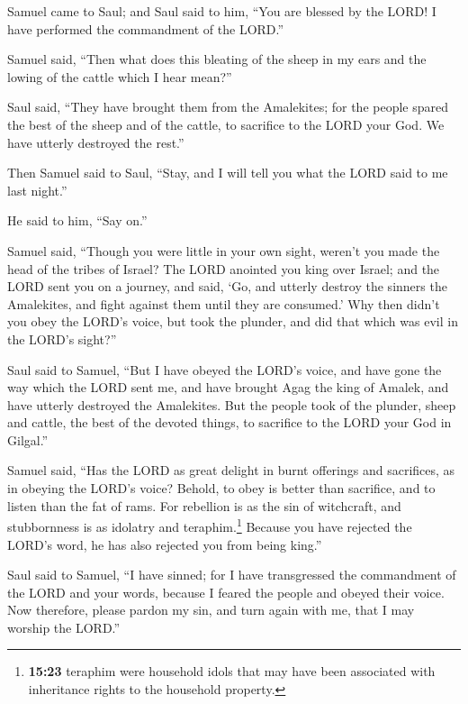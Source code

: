  Samuel came to Saul; and Saul said to him, ``You are
blessed by the LORD! I have performed the commandment of the LORD.''

 Samuel said, ``Then what does this bleating of the sheep
in my ears and the lowing of the cattle which I hear mean?''

 Saul said, ``They have brought them from the Amalekites;
for the people spared the best of the sheep and of the cattle, to
sacrifice to the LORD your God. We have utterly destroyed the rest.''

 Then Samuel said to Saul, ``Stay, and I will tell you
what the LORD said to me last night.''

He said to him, ``Say on.''

 Samuel said, ``Though you were little in your own sight,
weren't you made the head of the tribes of Israel? The LORD anointed you
king over Israel;  and the LORD sent you on a journey,
and said, `Go, and utterly destroy the sinners the Amalekites, and fight
against them until they are consumed.'  Why then didn't
you obey the LORD's voice, but took the plunder, and did that which was
evil in the LORD's sight?''

 Saul said to Samuel, ``But I have obeyed the LORD's
voice, and have gone the way which the LORD sent me, and have brought
Agag the king of Amalek, and have utterly destroyed the Amalekites.
 But the people took of the plunder, sheep and cattle,
the best of the devoted things, to sacrifice to the LORD your God in
Gilgal.''

 Samuel said, ``Has the LORD as great delight in burnt
offerings and sacrifices, as in obeying the LORD's voice? Behold, to
obey is better than sacrifice, and to listen than the fat of rams.
 For rebellion is as the sin of witchcraft, and
stubbornness is as idolatry and teraphim.\footnote{\textbf{15:23}
  teraphim were household idols that may have been associated with
  inheritance rights to the household property.} Because you have
rejected the LORD's word, he has also rejected you from being king.''

 Saul said to Samuel, ``I have sinned; for I have
transgressed the commandment of the LORD and your words, because I
feared the people and obeyed their voice.  Now therefore,
please pardon my sin, and turn again with me, that I may worship the
LORD.''

